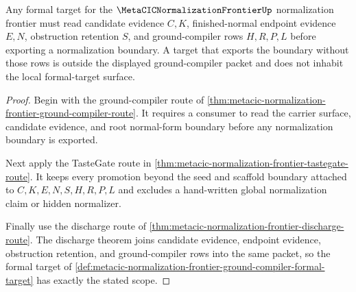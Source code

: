 \begin{theorem}
\label{thm:metacic-normalization-frontier-ground-compiler-target-scope}
Any formal target for the $\MetaCICNormalizationFrontierUp$ normalization frontier must read candidate evidence $C,K$, finished-normal endpoint evidence $E,N$, obstruction retention $S$, and ground-compiler rows $H,R,P,L$ before exporting a normalization boundary. A target that exports the boundary without those rows is outside the displayed ground-compiler packet and does not inhabit the local formal-target surface.
\end{theorem}
\begin{proof}
Begin with the ground-compiler route of \autoref{thm:metacic-normalization-frontier-ground-compiler-route}. It requires a consumer to read the carrier surface, candidate evidence, and root normal-form boundary before any normalization boundary is exported.

Next apply the TasteGate route in \autoref{thm:metacic-normalization-frontier-tastegate-route}. It keeps every promotion beyond the seed and scaffold boundary attached to $C,K,E,N,S,H,R,P,L$ and excludes a hand-written global normalization claim or hidden normalizer.

Finally use the discharge route of \autoref{thm:metacic-normalization-frontier-discharge-route}. The discharge theorem joins candidate evidence, endpoint evidence, obstruction retention, and ground-compiler rows into the same packet, so the formal target of \autoref{def:metacic-normalization-frontier-ground-compiler-formal-target} has exactly the stated scope.
\end{proof}

